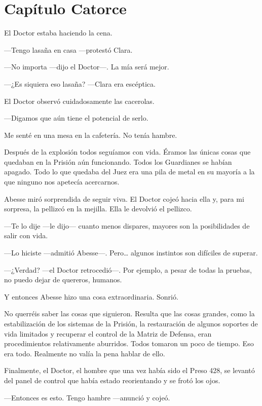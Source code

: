 \chapter*{Capítulo Catorce}

El Doctor estaba haciendo la cena.

---Tengo lasaña en casa ---protestó Clara.

---No importa ---dijo el Doctor---. La mía será mejor.

---¿Es siquiera eso lasaña? ---Clara era escéptica.

El Doctor observó cuidadosamente las cacerolas.

---Digamos que aún tiene el potencial de serlo.

Me senté en una mesa en la cafetería. No tenía hambre.

Después de la explosión todos seguíamos con vida. Éramos las únicas
cosas que quedaban en la Prisión aún funcionando. Todos los Guardianes
se habían apagado. Todo lo que quedaba del Juez era una pila de metal en
su mayoría a la que ninguno nos apetecía acercarnos.

Abesse miró sorprendida de seguir viva. El Doctor cojeó hacia ella y,
para mi sorpresa, la pellizcó en la mejilla. Ella le devolvió el
pellizco.

---Te lo dije ---le dijo--- cuanto menos dispares, mayores son la
posibilidades de salir con vida.

---Lo hiciste ---admitió Abesse---. Pero\ldots{} algunos instintos son
difíciles de superar.

---¿Verdad? ---el Doctor retrocedió---. Por ejemplo, a pesar de todas la
pruebas, no puedo dejar de quereros, humanos.

Y entonces Abesse hizo una cosa extraordinaria. Sonrió.

No querréis saber las cosas que siguieron. Resulta que las cosas
grandes, como la estabilización de los sistemas de la Prisión, la
restauración de algunos soportes de vida limitados y recuperar el
control de la Matriz de Defensa, eran procedimientos relativamente
aburridos. Todos tomaron un poco de tiempo. Eso era todo. Realmente no
valía la pena hablar de ello.

Finalmente, el Doctor, el hombre que una vez había sido el Preso 428, se
levantó del panel de control que había estado reorientando y se frotó
los ojos.

---Entonces es esto. Tengo hambre ---anunció y cojeó.

